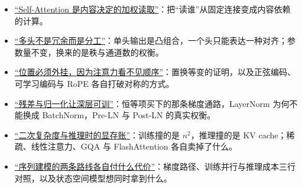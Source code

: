 \begin{itemize}
\tightlist
\item \hyperref[sec:14-Deep-Learning/05-Attention-and-Sequence-Models/01]{``Self-Attention 是内容决定的加权读取''}：把``读谁''从固定连接变成内容依赖的计算。
\item \hyperref[sec:14-Deep-Learning/05-Attention-and-Sequence-Models/02]{``多头不是冗余而是分工''}：单头输出是凸组合，一个头只能表达一种对齐；参数量不变，换来的是秩与通道数的权衡。
\item \hyperref[sec:14-Deep-Learning/05-Attention-and-Sequence-Models/03]{``位置必须外挂，因为注意力看不见顺序''}：置换等变的证明，以及正弦编码、可学习编码与 RoPE 各自打破对称的方式。
\item \hyperref[sec:14-Deep-Learning/05-Attention-and-Sequence-Models/04]{``残差与归一化让深层可训''}：恒等项买下的那条梯度通路，LayerNorm 为何不能换成 BatchNorm，Pre-LN 与 Post-LN 的真实权衡。
\item \hyperref[sec:14-Deep-Learning/05-Attention-and-Sequence-Models/05]{``二次复杂度与推理时的显存账''}：训练撞的是 \(n^2\)，推理撞的是 KV cache；稀疏、线性注意力、GQA 与 FlashAttention 各自卖掉了什么。
\item \hyperref[sec:14-Deep-Learning/05-Attention-and-Sequence-Models/06]{``序列建模的两条路线各自付什么代价''}：梯度路径、训练并行与推理成本三行对照，以及状态空间模型想同时拿到什么。
\end{itemize}
